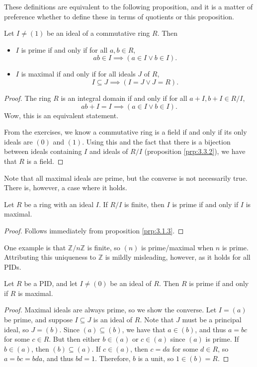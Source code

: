 These definitions are equivalent to the following proposition, and it is a matter of preference whether to define these in terms of quotients or this proposition.
\begin{proposition}\label{prp:3.4.3}
	Let $I\neq (1)$ be an ideal of a commutative ring $R$. Then
	\begin{itemize}
		\item $I$ is prime if and only if for all $a,b\in R$,
			\[
				ab\in I \implies (a\in I \lor b\in I)
			.\]
		\item $I$ is maximal if and only if for all ideals $J$ of $R$,
			\[
				I\subseteq J\implies (I=J \lor J=R)
			.\]
	\end{itemize}
\end{proposition}
\begin{proof}
	The ring $R$ is an integral domain if and only if for all $a+I,b+I\in R /I$,
	\[
		ab+I=I \implies (a\in I \lor b\in I)
	.\]
	Wow, this is an equivalent statement.

	From the exercises, we know a commutative ring is a field if and only if its only ideals are $\left( 0 \right) $ and $(1)$. Using this and the fact that there is a bijection between ideals containing $I$ and ideals of $R /I$ (proposition \ref{prp:3.3.2}), we have that $R$ is a field.
\end{proof}

Note that all maximal ideals are prime, but the converse is not necessarily true. There is, however, a case where it holds.
\begin{proposition}\label{prp:3.4.4}
	Let $R$ be a ring with an ideal $I$. If $R /I$ is finite, then $I$ is prime if and only if $I$ is maximal.
\end{proposition}
\begin{proof}
	Follows immediately from proposition \ref{prp:3.1.3}.
\end{proof}

One example is that $\mathbb{Z}/n\mathbb{Z}$ is finite, so $(n)$ is prime/maximal when $n$ is prime. Attributing this uniqueness to $\mathbb{Z}$ is mildly misleading, however, as it holds for all PIDs.
\begin{proposition}\label{prp:3.4.5}
	Let $R$ be a PID,  and let $I\neq (0)$ be an ideal of $R$. Then $R$ is prime if and only if $R$ is maximal.
\end{proposition}
\begin{proof}
	Maximal ideals are always prime, so we show the converse. Let $I=(a)$ be prime, and suppose $I\subseteq J$ is an ideal of $R$. Note that $J$ must be a principal ideal, so  $J=(b)$.  Since $(a)\subseteq (b)$, we have that $a\in (b)$, and thus $a=bc$ for some $c\in R$. But then either $b\in (a)$ or $c\in (a)$ since $(a)$ is prime. If $b\in (a)$, then $(b)\subseteq (a)$. If $c\in (a)$, then $c=da$ for some $d\in R$, so $a=bc=bda$, and thus  $bd=1$. Therefore, $b$ is a unit, so $1\in (b)=R$.
\end{proof}

